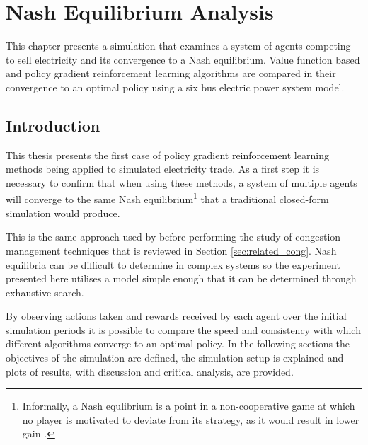 \chapter{Nash Equilibrium Analysis}
\label{ch:nashanalysis}
This chapter presents a simulation that examines a system of agents competing to
sell electricity and its convergence to a Nash equilibrium.  Value function
based and policy gradient reinforcement learning algorithms are compared in
their convergence to an optimal policy using a six bus electric power system
model.

\section{Introduction}
This thesis presents the first case of policy gradient reinforcement learning
methods being applied to simulated electricity trade.  As a first step it is
necessary to confirm that when using these methods, a system of multiple agents
will converge to the same Nash equilibrium\footnote{Informally, a Nash
equlibrium is a point in a non-cooperative game at which no player is motivated
to deviate from its strategy, as it would result in lower gain
\cite{nash50,nash51}.} that a traditional closed-form simulation would produce.

This is the same approach used by  before performing the
study of congestion management techniques that is reviewed in Section
\ref{sec:related_cong}.  Nash equilibria can be difficult
to determine in complex systems so the experiment presented here utilises a
model simple enough that it can be determined through exhaustive search.

By observing actions taken and rewards received by each agent over the
initial simulation periods it is possible to compare the speed and consistency
with which different algorithms converge to an optimal policy. In the following
sections the objectives of the simulation are defined, the simulation setup
is explained and plots of results, with discussion and critical analysis, are
provided.

